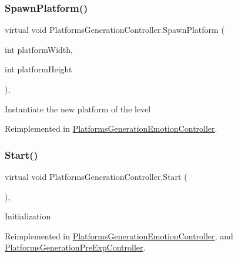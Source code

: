 \subsubsection{\texorpdfstring{Spawn\+Platform()}{SpawnPlatform()}}
{\footnotesize\ttfamily virtual void Platforms\+Generation\+Controller.\+Spawn\+Platform (\begin{DoxyParamCaption}\item[{int}]{platform\+Width,  }\item[{int}]{platform\+Height }\end{DoxyParamCaption})\hspace{0.3cm}{\ttfamily [protected]}, {\ttfamily [virtual]}}

Instantiate the new platform of the level 

Reimplemented in \mbox{\hyperlink{class_platforms_generation_emotion_controller_a6cc960afa43cdfc9c688b155fd262703}{Platforms\+Generation\+Emotion\+Controller}}.

\mbox{\label{class_platforms_generation_controller_a3bc338f320d39a1a549648d2ce11074d}} 
\subsubsection{\texorpdfstring{Start()}{Start()}}
{\footnotesize\ttfamily virtual void Platforms\+Generation\+Controller.\+Start (\begin{DoxyParamCaption}{ }\end{DoxyParamCaption})\hspace{0.3cm}{\ttfamily [protected]}, {\ttfamily [virtual]}}

Initialization 

Reimplemented in \mbox{\hyperlink{class_platforms_generation_emotion_controller_a6014a59da6d2d4d789527778f78db7fe}{Platforms\+Generation\+Emotion\+Controller}}, and \mbox{\hyperlink{class_platforms_generation_pre_exp_controller_a839b8a8e2ce74f9388aae0a4f937b836}{Platforms\+Generation\+Pre\+Exp\+Controller}}.

\mbox{\label{class_platforms_generation_controller_ab12ea5197eb0395e3863e5ca8059881b}} 
